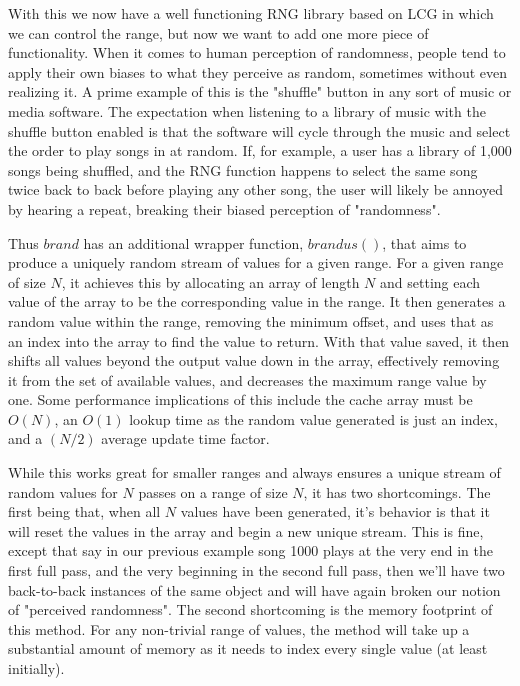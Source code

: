 \documentclass[12pt,letter,notitlepage]{article}
\begin{document}
With this we now have a well functioning RNG library based on LCG in which we can control the range, but now we want to add one more piece of functionality. When it comes to human perception of randomness, people tend to apply their own biases to what they perceive as random, sometimes without even realizing it. A prime example of this is the "shuffle" button in any sort of music or media software. The expectation when listening to a library of music with the shuffle button enabled is that the software will cycle through the music and select the order to play songs in at random. If, for example, a user has a library of 1,000 songs being shuffled, and the RNG function happens to select the same song twice back to back before playing any other song, the user will likely be annoyed by hearing a repeat, breaking their biased perception of "randomness".

Thus $brand$ has an additional wrapper function, $brandus()$, that aims to produce a uniquely random stream of values for a given range. For a given range of size $N$, it achieves this by allocating an array of length $N$ and setting each value of the array to be the corresponding value in the range. It then generates a random value within the range, removing the minimum offset, and uses that as an index into the array to find the value to return. With that value saved, it then shifts all values beyond the output value down in the array, effectively removing it from the set of available values, and decreases the maximum range value by one. Some performance implications of this include the cache array must be $O(N)$, an $O(1)$ lookup time as the random value generated is just an index, and a $(N/2)$ average update time factor.

While this works great for smaller ranges and always ensures a unique stream of random values for $N$ passes on a range of size $N$, it has two shortcomings. The first being that, when all $N$ values have been generated, it's behavior is that it will reset the values in the array and begin a new unique stream. This is fine, except that say in our previous example song 1000 plays at the very end in the first full pass, and the very beginning in the second full pass, then we'll have two back-to-back instances of the same object and will have again broken our notion of "perceived randomness". The second shortcoming is the memory footprint of this method. For any non-trivial range of values, the method will take up a substantial amount of memory as it needs to index every single value (at least initially).
\end{document}
